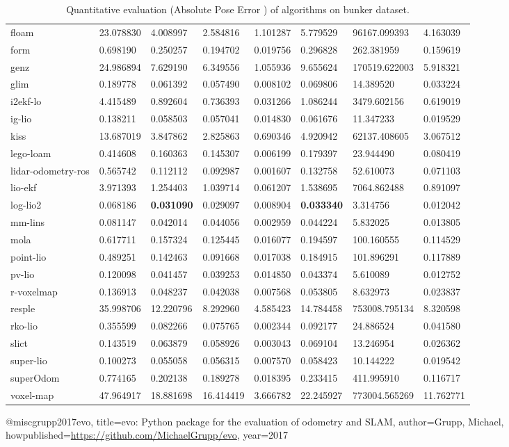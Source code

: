 \begin{table}[]
{\begin{tabular}{llllllll}
		floam & 23.078830 & 4.008997 & 2.584816 & 1.101287 & 5.779529 & 96167.099393 & 4.163039 \\
		form & 0.698190 & 0.250257 & 0.194702 & 0.019756 & 0.296828 & 262.381959 & 0.159619 \\
		genz & 24.986894 & 7.629190 & 6.349556 & 1.055936 & 9.655624 & 170519.622003 & 5.918321 \\
		glim & 0.189778 & 0.061392 & 0.057490 & 0.008102 & 0.069806 & 14.389520 & 0.033224 \\
		i2ekf-lo & 4.415489 & 0.892604 & 0.736393 & 0.031266 & 1.086244 & 3479.602156 & 0.619019 \\
		ig-lio & 0.138211 & 0.058503 & 0.057041 & 0.014830 & 0.061676 & 11.347233 & 0.019529 \\
		kiss & 13.687019 & 3.847862 & 2.825863 & 0.690346 & 4.920942 & 62137.408605 & 3.067512 \\
		lego-loam & 0.414608 & 0.160363 & 0.145307 & 0.006199 & 0.179397 & 23.944490 & 0.080419 \\
		lidar-odometry-ros & 0.565742 & 0.112112 & 0.092987 & 0.001607 & 0.132758 & 52.610073 & 0.071103 \\
		lio-ekf & 3.971393 & 1.254403 & 1.039714 & 0.061207 & 1.538695 & 7064.862488 & 0.891097 \\
		log-lio2 & 0.068186 & \textbf{0.031090} & 0.029097 & 0.008904 & \textbf{0.033340} & 3.314756 & 0.012042 \\
		mm-lins & 0.081147 & 0.042014 & 0.044056 & 0.002959 & 0.044224 & 5.832025 & 0.013805 \\
		mola & 0.617711 & 0.157324 & 0.125445 & 0.016077 & 0.194597 & 100.160555 & 0.114529 \\
		point-lio & 0.489251 & 0.142463 & 0.091668 & 0.017038 & 0.184915 & 101.896291 & 0.117889 \\
		pv-lio & 0.120098 & 0.041457 & 0.039253 & 0.014850 & 0.043374 & 5.610089 & 0.012752 \\
		r-voxelmap & 0.136913 & 0.048237 & 0.042038 & 0.007568 & 0.053805 & 8.632973 & 0.023837 \\
		resple & 35.998706 & 12.220796 & 8.292960 & 4.585423 & 14.784458 & 753008.795134 & 8.320598 \\
		rko-lio & 0.355599 & 0.082266 & 0.075765 & 0.002344 & 0.092177 & 24.886524 & 0.041580 \\
		slict & 0.143519 & 0.063879 & 0.058926 & 0.003043 & 0.069104 & 13.246954 & 0.026362 \\
		super-lio & 0.100273 & 0.055058 & 0.056315 & 0.007570 & 0.058423 & 10.144222 & 0.019542 \\
		superOdom & 0.774165 & 0.202138 & 0.189278 & 0.018395 & 0.233415 & 411.995910 & 0.116717 \\
		voxel-map & 47.964917 & 18.881698 & 16.414419 & 3.666782 & 22.245927 & 773004.565269 & 11.762771 \\
        	\end{tabular}%
        }
        	\caption{Quantitative evaluation (Absolute Pose Error \cite{grupp2017evo}) of algorithms on bunker dataset.}
        	\label{table3}
\end{table}

@misc{grupp2017evo,
  title={evo: Python package for the evaluation of odometry and SLAM},
  author={Grupp, Michael},
  howpublished={\url{https://github.com/MichaelGrupp/evo}},
  year={2017}
}
